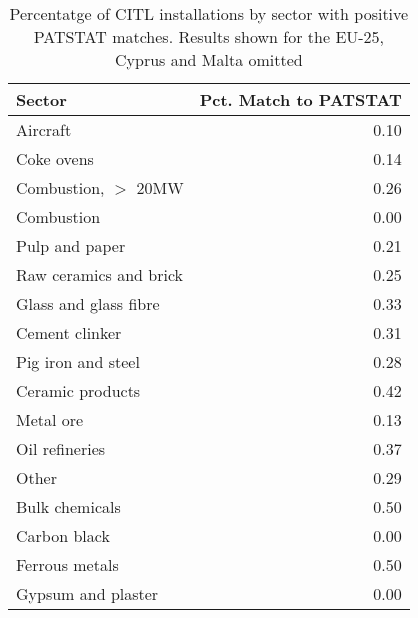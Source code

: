 \begin{table}[ht]
\centering
\begin{tabular}{lr}
  \hline
Sector & Pct. Match to PATSTAT \\ 
  \hline
Aircraft & 0.10 \\ 
  Coke ovens & 0.14 \\ 
  Combustion, $>$ 20MW & 0.26 \\ 
  Combustion & 0.00 \\ 
  Pulp and paper & 0.21 \\ 
  Raw ceramics and brick & 0.25 \\ 
  Glass and glass fibre & 0.33 \\ 
  Cement clinker & 0.31 \\ 
  Pig iron and steel & 0.28 \\ 
  Ceramic products & 0.42 \\ 
  Metal ore & 0.13 \\ 
  Oil refineries & 0.37 \\ 
  Other & 0.29 \\ 
  Bulk chemicals & 0.50 \\ 
  Carbon black & 0.00 \\ 
  Ferrous metals & 0.50 \\ 
  Gypsum and plaster & 0.00 \\ 
   \hline
\end{tabular}
\caption{Percentatge of CITL installations by sector with positive PATSTAT matches. Results shown for the EU-25, Cyprus and Malta omitted} 
\label{tab:pct-match-bytype}
\end{table}
